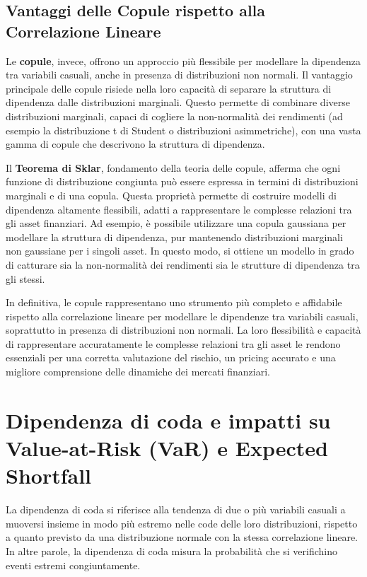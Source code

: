 \documentclass[%
	corpo=11pt,
    twoside,
    stile=classica,
    oldstyle,
    tipotesi=custom,
    greek,
    evenboxes,
]{toptesi}
\begin{document}
\subsection{Vantaggi delle Copule rispetto alla Correlazione Lineare}
Le \textbf{copule}, invece, offrono un approccio più flessibile per modellare la dipendenza tra variabili casuali, anche in presenza di distribuzioni non normali. Il vantaggio principale delle copule risiede nella loro capacità di separare la struttura di dipendenza dalle distribuzioni marginali. Questo permette di combinare diverse distribuzioni marginali, capaci di cogliere la non-normalità dei rendimenti (ad esempio la distribuzione t di Student o distribuzioni asimmetriche), con una vasta gamma di copule che descrivono la struttura di dipendenza.

Il \textbf{Teorema di Sklar}, fondamento della teoria delle copule, afferma che ogni funzione di distribuzione congiunta può essere espressa in termini di distribuzioni marginali e di una copula. Questa proprietà permette di costruire modelli di dipendenza altamente flessibili, adatti a rappresentare le complesse relazioni tra gli asset finanziari. Ad esempio, è possibile utilizzare una copula gaussiana per modellare la struttura di dipendenza, pur mantenendo distribuzioni marginali non gaussiane per i singoli asset. In questo modo, si ottiene un modello in grado di catturare sia la non-normalità dei rendimenti sia le strutture di dipendenza tra gli stessi.

In definitiva, le copule rappresentano uno strumento più completo e affidabile rispetto alla correlazione lineare per modellare le dipendenze tra variabili casuali, soprattutto in presenza di distribuzioni non normali. La loro flessibilità e capacità di rappresentare accuratamente le complesse relazioni tra gli asset le rendono essenziali per una corretta valutazione del rischio, un pricing accurato e una migliore comprensione delle dinamiche dei mercati finanziari.
\newpage
\section{Dipendenza di coda e impatti su Value-at-Risk (VaR) e Expected Shortfall}

La dipendenza di coda si riferisce alla tendenza di due o più variabili casuali a muoversi insieme in modo più estremo nelle code delle loro distribuzioni, rispetto a quanto previsto da una distribuzione normale con la stessa correlazione lineare. In altre parole, la dipendenza di coda misura la probabilità che si verifichino eventi estremi congiuntamente.
\end{document}
